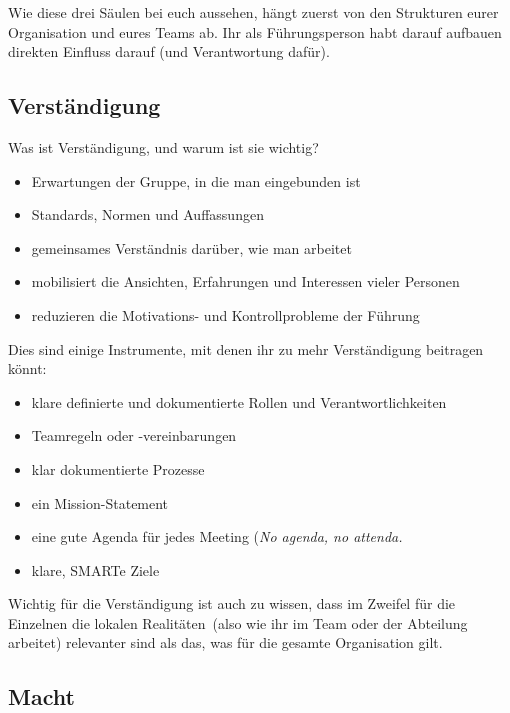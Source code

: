 Wie diese drei Säulen bei euch aussehen, hängt zuerst von den Strukturen eurer Organisation und eures Teams ab. Ihr als Führungsperson habt darauf aufbauen direkten Einfluss darauf (und Verantwortung dafür).


\subsection{Verständigung}

Was ist Verständigung, und warum ist sie wichtig?

\begin{itemize}
  \item Erwartungen der Gruppe, in die man eingebunden ist
  \item Standards, Normen und Auffassungen
  \item gemeinsames Verständnis darüber, wie man arbeitet
  \item mobilisiert die Ansichten, Erfahrungen und Interessen vieler Personen
  \item reduzieren die Motivations- und Kontrollprobleme der Führung
\end{itemize}

Dies sind einige Instrumente, mit denen ihr zu mehr Verständigung beitragen könnt:

\begin{itemize}
  \item klare definierte und dokumentierte Rollen und Verantwortlichkeiten 
  \item Teamregeln oder -vereinbarungen 
  \item klar dokumentierte Prozesse 
  \item ein Mission-Statement 
  \item eine gute Agenda für jedes Meeting (\glqq\emph{No agenda, no attenda.\grqq} 
  \item klare, SMARTe Ziele
\end{itemize}

Wichtig für die Verständigung ist auch zu wissen, dass im Zweifel für die Einzelnen die \glqq lokalen Realitäten\grqq\ (also wie ihr im Team oder der Abteilung arbeitet) relevanter sind als das, was für die gesamte Organisation gilt.


\subsection{Macht}

